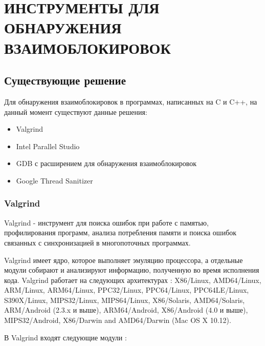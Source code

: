 \chapter{\MakeUppercase{Инструменты для обнаружения взаимоблокировок}}

\section{Существующие решение}

Для обнаружения взаимоблокировок в программах, написанных на C и C++, на данный момент существуют данные решения:

\begin{itemize}  
\item Valgrind
\item Intel Parallel Studio
\item GDB с расширением для обнаружения взаимоблокировок
\item Google Thread Sanitizer
\end{itemize}

\subsection{Valgrind}

Valgrind \cite{ValgrindWiki} - инструмент для поиска ошибок при работе с памятью, профилирования программ, анализа потребления памяти и поиска ошибок связанных с синхронизацией в многопоточных программах.

Valgrind имеет ядро, которое выполняет эмуляцию процессора, а отдельные модули собирают и анализируют информацию, полученную во время исполнения кода. Valgrind работает на следующих архитектурах \cite{ValgrindHome}: X86/Linux, AMD64/Linux, ARM/Linux, ARM64/Linux, PPC32/Linux, PPC64/Linux, PPC64LE/Linux, S390X/Linux, MIPS32/Linux, MIPS64/Linux, X86/Solaris, AMD64/Solaris, ARM/Android (2.3.x и выше), ARM64/Android, X86/Android (4.0 и выше), MIPS32/Android, X86/Darwin and AMD64/Darwin (Mac OS X 10.12).

В Valgrind входят следующие модули \cite{ValgrindArch}:

